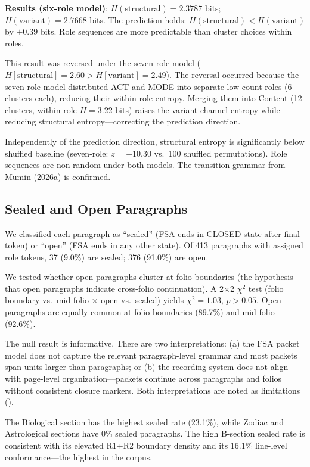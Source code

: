 \documentclass[11pt,a4paper,twocolumn]{article}
\begin{document}
\textbf{Results (six-role model)}: $H(\text{structural}) = 2.3787$ bits; $H(\text{variant}) = 2.7668$ bits. The prediction holds: $H(\text{structural}) < H(\text{variant})$ by $+0.39$ bits. Role sequences are more predictable than cluster choices within roles.

This result was reversed under the seven-role model ($H[\text{structural}] = 2.60 > H[\text{variant}] = 2.49$). The reversal occurred because the seven-role model distributed ACT and MODE into separate low-count roles (6 clusters each), reducing their within-role entropy. Merging them into Content (12 clusters, within-role $H = 3.22$ bits) raises the variant channel entropy while reducing structural entropy---correcting the prediction direction.

Independently of the prediction direction, structural entropy is significantly below shuffled baseline (seven-role: $z = -10.30$ vs.\ 100 shuffled permutations). Role sequences are non-random under both models. The transition grammar from Mumin (2026a) is confirmed.

\subsection{Sealed and Open Paragraphs}
\label{sec:sessions}

We classified each paragraph as ``sealed'' (FSA ends in CLOSED state after final token) or ``open'' (FSA ends in any other state). Of 413 paragraphs with assigned role tokens, 37 (9.0\%) are sealed; 376 (91.0\%) are open.

We tested whether open paragraphs cluster at folio boundaries (the hypothesis that open paragraphs indicate cross-folio continuation). A 2$\times$2 $\chi^2$ test (folio boundary vs.\ mid-folio $\times$ open vs.\ sealed) yields $\chi^2 = 1.03$, $p > 0.05$. Open paragraphs are equally common at folio boundaries (89.7\%) and mid-folio (92.6\%).

The null result is informative. There are two interpretations: (a) the FSA packet model does not capture the relevant paragraph-level grammar and most packets span units larger than paragraphs; or (b) the recording system does not align with page-level organization---packets continue across paragraphs and folios without consistent closure markers. Both interpretations are noted as limitations ().

The Biological section has the highest sealed rate (23.1\%), while Zodiac and Astrological sections have 0\% sealed paragraphs. The high B-section sealed rate is consistent with its elevated R1+R2 boundary density and its 16.1\% line-level conformance---the highest in the corpus.
\end{document}
